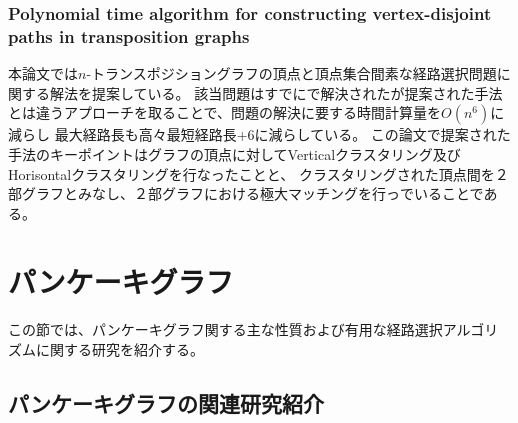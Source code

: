 \documentclass[11pt,a4j]{jsarticle}
\theoremstyle{plain}
\begin{document}
\subsubsection{Polynomial time algorithm for constructing vertex-disjoint paths in transposition graphs}
本論文\cite{tp-n2s2}では$n$-トランスポジショングラフの頂点と頂点集合間素な経路選択問題に関する解法を提案している。
該当問題はすでに\cite{tp-n2n}で解決されたが提案された手法とは違うアプローチを取ることで、問題の解決に要する時間計算量を$O(n^6)$に減らし
最大経路長も高々最短経路長+6に減らしている。\newline
この論文で提案された手法のキーポイントはグラフの頂点に対してVerticalクラスタリング及びHorisontalクラスタリングを行なったことと、
クラスタリングされた頂点間を２部グラフとみなし、２部グラフにおける極大マッチングを行っでいることである。

\section{パンケーキグラフ}
この節では、パンケーキグラフ関する主な性質および有用な経路選択アルゴリズムに関する研究を紹介する。


\subsection{パンケーキグラフの関連研究紹介}
\end{document}
